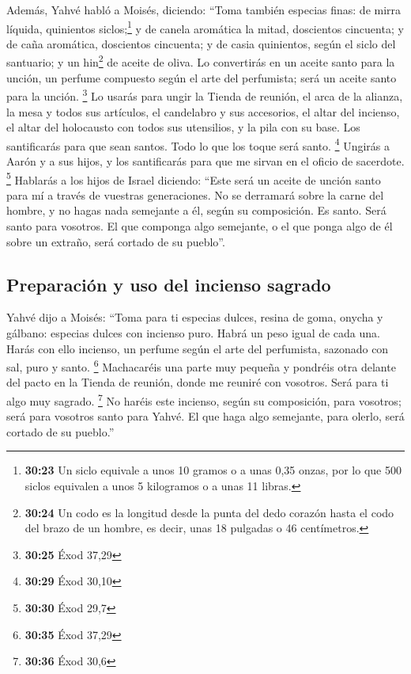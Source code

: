 \begin{paracol}{2}
 Además, Yahvé habló a Moisés, diciendo: 
``Toma también especias finas: de mirra líquida, quinientos
siclos;\footnote{\textbf{30:23} Un siclo equivale a unos 10 gramos o a
  unas 0,35 onzas, por lo que 500 siclos equivalen a unos 5 kilogramos o
  a unas 11 libras.} y de canela aromática la mitad, doscientos
cincuenta; y de caña aromática, doscientos cincuenta;  y
de casia quinientos, según el siclo del santuario; y un hin\footnote{\textbf{30:24}
  Un codo es la longitud desde la punta del dedo corazón hasta el codo
  del brazo de un hombre, es decir, unas 18 pulgadas o 46 centímetros.}
de aceite de oliva.  Lo convertirás en un aceite santo
para la unción, un perfume compuesto según el arte del perfumista; será
un aceite santo para la unción. \footnote{\textbf{30:25} Éxod 37,29}
 Lo usarás para ungir la Tienda de reunión, el arca de la
alianza,  la mesa y todos sus artículos, el candelabro y
sus accesorios, el altar del incienso,  el altar del
holocausto con todos sus utensilios, y la pila con su base.
 Los santificarás para que sean santos. Todo lo que los
toque será santo. \footnote{\textbf{30:29} Éxod 30,10} 
Ungirás a Aarón y a sus hijos, y los santificarás para que me sirvan en
el oficio de sacerdote. \footnote{\textbf{30:30} Éxod 29,7}
 Hablarás a los hijos de Israel diciendo: ``Este será un
aceite de unción santo para mí a través de vuestras generaciones.
 No se derramará sobre la carne del hombre, y no hagas
nada semejante a él, según su composición. Es santo. Será santo para
vosotros.  El que componga algo semejante, o el que ponga
algo de él sobre un extraño, será cortado de su pueblo''.

\hypertarget{preparaciuxf3n-y-uso-del-incienso-sagrado}{%
\subsection{Preparación y uso del incienso
sagrado}\label{preparaciuxf3n-y-uso-del-incienso-sagrado}}

 Yahvé dijo a Moisés: ``Toma para ti especias dulces,
resina de goma, onycha y gálbano: especias dulces con incienso puro.
Habrá un peso igual de cada una.  Harás con ello
incienso, un perfume según el arte del perfumista, sazonado con sal,
puro y santo. \footnote{\textbf{30:35} Éxod 37,29} 
Machacaréis una parte muy pequeña y pondréis otra delante del pacto en
la Tienda de reunión, donde me reuniré con vosotros. Será para ti algo
muy sagrado. \footnote{\textbf{30:36} Éxod 30,6}  No
haréis este incienso, según su composición, para vosotros; será para
vosotros santo para Yahvé.  El que haga algo semejante,
para olerlo, será cortado de su pueblo.''


\end{paracol}
